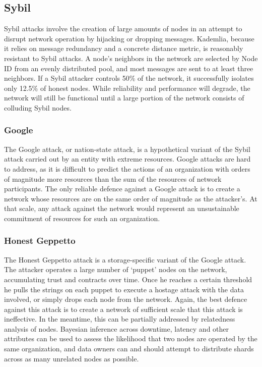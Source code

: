 \documentclass[a4paper,10pt]{article}
\begin{document}
\subsection{Sybil}

Sybil attacks involve the creation of large amounts of nodes in an attempt to disrupt network operation by hijacking or dropping messages. Kademlia, because it relies on message redundancy and a concrete distance metric, is reasonably resistant to Sybil attacks. A node’s neighbors in the network are selected by Node ID from an evenly distributed pool, and most messages are sent to at least three neighbors. If a Sybil attacker controls 50\% of the network, it successfully isolates only 12.5\% of honest nodes. While reliability and performance will degrade, the network will still be functional until a large portion of the network consists of colluding Sybil nodes.

\subsubsection{Google}
The Google attack, or nation-state attack, is a hypothetical variant of the Sybil attack carried out by an entity with extreme resources. Google attacks are hard to address, as it is difficult to predict the actions of an organization with orders of magnitude more resources than the sum of the resources of network participants. The only reliable defence against a Google attack is to create a network whose resources are on the same order of magnitude as the attacker’s. At that scale, any attack against the network would represent an unsustainable commitment of resources for such an organization.

\subsubsection{Honest Geppetto}
The Honest Geppetto attack is a storage-specific variant of the Google attack. The attacker operates a large number of ‘puppet’ nodes on the network, accumulating trust and contracts over time. Once he reaches a certain threshold he pulls the strings on each puppet to execute a hostage attack with the data involved, or simply drops each node from the network. Again, the best defence against this attack is to create a network of sufficient scale that this attack is ineffective. In the meantime, this can be partially addressed by relatedness analysis of nodes. Bayesian inference across downtime, latency and other attributes can be used to assess the likelihood that two nodes are operated by the same organization, and data owners can and should attempt to distribute shards across as many unrelated nodes as possible.
\end{document}
